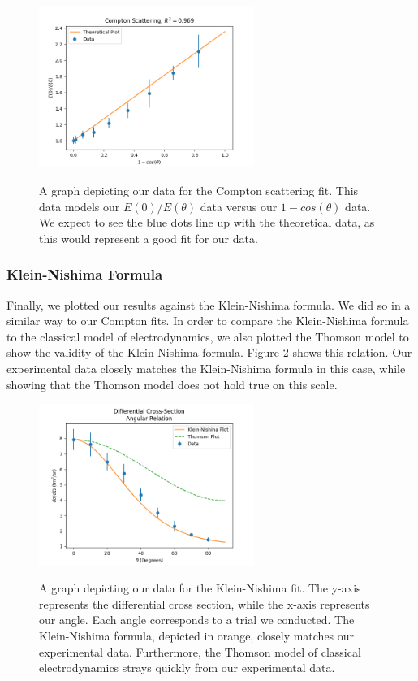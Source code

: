 \documentclass[10pt,letterpaper,onecolumn]{article}
\begin{document}
\begin{figure}[hbt!]
    \begin{center}
        {{\includegraphics[width=7cm]{R2Compton.png} }}%
        \caption{A graph depicting our data for the Compton scattering fit. This data models our $E(0)/E(\theta)$ data versus our $1 - cos(\theta)$ data. We expect to see the blue dots line up with the theoretical data, as this would represent a good fit for our data.}%
        \label{fig:r2}%
    \end{center}
\end{figure}

\subsubsection*{Klein-Nishima Formula}
Finally, we plotted our results against the Klein-Nishima formula. We did so in a similar way to our Compton fits. In order to compare the Klein-Nishima formula to the classical model of electrodynamics, we also plotted the Thomson model to show the validity of the Klein-Nishima formula. Figure \ref{fig:kn} shows this relation. Our experimental data closely matches the Klein-Nishima formula in this case, while showing that the Thomson model does not hold true on this scale.
\begin{figure}[hbt!]
    \begin{center}
        {{\includegraphics[width=7cm]{KNvsT.png} }}%
        \caption{A graph depicting our data for the Klein-Nishima fit. The y-axis represents the differential cross section, while the x-axis represents our angle. Each angle corresponds to a trial we conducted. The Klein-Nishima formula, depicted in orange, closely matches our experimental data. Furthermore, the Thomson model of classical electrodynamics strays quickly from our experimental data.}%
        \label{fig:kn}%
    \end{center}
\end{figure}
\end{document}
